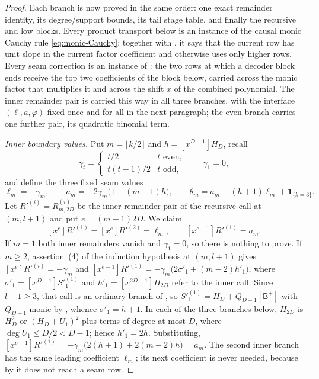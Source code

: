 \begin{proof}
      Each branch is now proved in the same order: one exact remainder
      identity, its degree/support bounds, its tail stage table, and finally
      the recursive and low blocks.  Every product transport below is an
      instance of the causal monic Cauchy rule
      \eqref{eq:monic-Cauchy}; together with
      , it says that the current row has unit slope
      in the current factor coefficient and otherwise uses only higher rows.
      Every seam correction is an instance of :
      the two rows at which a decoder block ends receive the top two
      coefficients of the block below, carried across the monic factor that
      multiplies it and across the shift $x$ of the combined polynomial.
      The inner remainder pair is carried this way in all three branches,
      with the interface $(\ell,a,\varphi)$ fixed once and for all in the
      next paragraph; the even branch carries one further pair, its
      quadratic binomial term.

      \smallskip\noindent\emph{Inner boundary values.}
      Put $m=\lfloor k/2\rfloor$ and $h=[x^{D-1}]H_D$, recall
      \[
        \gamma_t=\begin{cases}t/2&t\text{ even},\\ t(t-1)/2&t\text{ odd},\end{cases}
        \qquad \gamma_1=0,
      \]
      and define the three fixed seam values
      \[
        \ell_m=-\gamma_m,\qquad
        a_m=-2\gamma_m\bigl(1+(m-1)h\bigr),\qquad
        \theta_m=a_m+(h+1)\ell_m+\mathbf 1_{\{k=3\}}.
        \tag{inner-boundary}\label{eq:inner-boundary}
      \]
      Let $R'^{(i)}=R^{(i)}_{m,2D}$ be the inner remainder pair of the
      recursive call at $(m,l+1)$ and put $e=(m-1)2D$.  We claim
      \[
        [x^{e}]R'^{(1)}=[x^{e}]R'^{(2)}=\ell_m,
        \qquad
        [x^{e-1}]R'^{(1)}=a_m .
        \tag{inner-top-two}\label{eq:inner-top-two}
      \]
      If $m=1$ both inner remainders vanish and $\gamma_1=0$, so there is
      nothing to prove.  If $m\ge2$, assertion~(4) of the induction
      hypothesis at $(m,l+1)$ gives $[x^e]R'^{(i)}=-\gamma_m$ and
      $[x^{e-1}]R'^{(1)}=-\gamma_m\bigl(2\sigma'_1+(m-2)h'_1\bigr)$, where
      $\sigma'_1=[x^{D-1}]S'^{(1)}_1$ and $h'_1=[x^{2D-1}]H_{2D}$ refer to
      the inner call.  Since $l+1\ge3$, that call is an ordinary branch of
      , so $S'^{(1)}_1=H_D+Q_{D-1}[\mathsf B^+]$ with
      $Q_{D-1}$ monic by , whence
      $\sigma'_1=h+1$.  In each of the three branches below, $H_{2D}$ is
      $H_D^2$ or $(H_D+U_1)^2$ plus terms of degree at most $D$, where
      $\deg U_1\le D/2<D-1$; hence $h'_1=2h$.  Substituting,
      $[x^{e-1}]R'^{(1)}=-\gamma_m\bigl(2(h+1)+2(m-2)h\bigr)=a_m$.
      The second inner branch has the same leading coefficient $\ell_m$;
      its next coefficient is never needed, because by
       it does not reach a seam row.


\end{proof}
